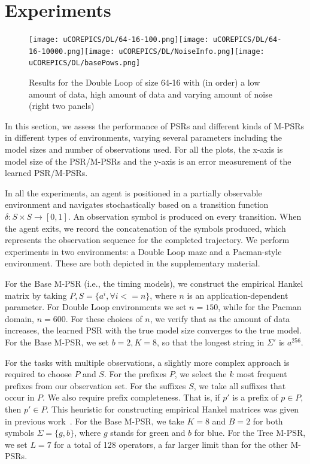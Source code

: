 \section{Experiments}


\begin{figure}[ht!]
\centering
\texttt{[image: uCOREPICS/DL/64-16-100.png]}\texttt{[image: uCOREPICS/DL/64-16-10000.png]}\texttt{[image: uCOREPICS/DL/NoiseInfo.png]}\texttt{[image: uCOREPICS/DL/basePows.png]}

\caption{Results for the Double Loop of size 64-16 with (in order) a low amount of data, high amount of data and varying amount of noise (right two panels)\label{fig-double}}
\end{figure}


In this section, we assess the performance of PSRs and different kinds of M-PSRs in different types of environments, varying several parameters including the model sizes and number of observations used. For all the plots, the x-axis is model size of the PSR/M-PSRs and the y-axis is an error measurement of the learned PSR/M-PSRs.

In all the experiments, an agent is positioned in  a partially observable environment and  navigates  stochastically based on a transition function $\delta:S \times S\rightarrow[0,1]$. An observation symbol is produced on every transition. When the agent exits, we record the concatenation of the symbols produced, which represents the observation sequence for the completed trajectory.  We perform experiments in two environments: a Double Loop maze and a Pacman-style environment. These are both depicted in the supplementary material.


For the Base M-PSR (i.e., the timing models), we construct the empirical Hankel matrix by taking $P,S = \{a^i, \forall i<=n\}$, where $n$ is an application-dependent parameter. For Double Loop environments we set $n = 150$, while for the Pacman domain, $n = 600$. For these choices of $n$, we verify that as the amount of data increases, the learned PSR with the true model size converges to the true model. For the Base M-PSR, we set $b=2,K=8$, so that the longest string in $\Sigma'$ is $a^{256}$.

For the tasks with multiple observations, a slightly more complex approach is required to choose $P$ and $S$. For the prefixes $P$, we select the $k$ most frequent prefixes from our observation set. For the suffixes $S$, we take all suffixes that occur in $P$. We also require prefix completeness. That is, if $p'$ is a prefix of $p \in P$, then $p' \in P$. This heuristic for constructing empirical Hankel matrices was given in previous work~\cite{icml12}. For the Base M-PSR, we take $K=8$ and $B=2$ for both symbols $\Sigma=\{g,b\}$, where $g$ stands for green and $b$ for blue. For the Tree M-PSR, we set $L=7$ for a total of 128 operators, a far larger limit  than for the other M-PSRs. 

